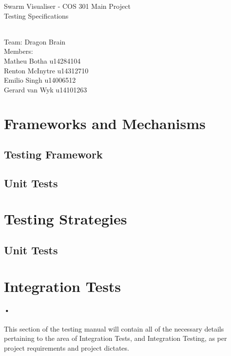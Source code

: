 \documentclass[11pt]{article}
\begin{document}
\begin{titlepage}

\begin{center}
\begin{huge}
Swarm Visualiser - COS 301 Main Project
\\
Testing Specifications
\begin{small}
\\
Team: Dragon Brain
\\
Members:
\\
Matheu Botha u14284104
\\
Renton McInytre u14312710
\\
Emilio Singh u14006512
\\
Gerard van Wyk u14101263

\end{small}

\end{huge}
\end{center}
\end{titlepage}

\pagebreak

\tableofcontents

\section{Frameworks and Mechanisms}
\subsection{Testing Framework}
\lipsum
\subsection{Unit Tests}
\lipsum
\section{Testing Strategies}
\subsection{Unit Tests}
\lipsum
\section{Integration Tests}
\paragraph{•}
This section of the testing manual will contain all of the necessary details pertaining to the area of Integration Tests, and Integration Testing, as per project requirements and project dictates.
\end{document}
